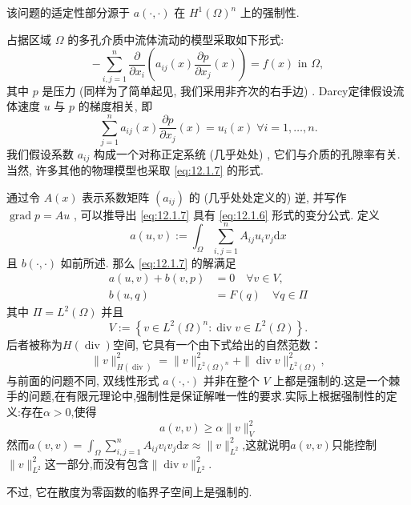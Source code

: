 该问题的适定性部分源于 $a\left( {\cdot , \cdot  }\right)$ 在 ${H}^{1}{\left( \Omega \right) }^{n}$ 上的强制性.\par
占据区域 $\Omega$ 的多孔介质中流体流动的模型采取如下形式:
\begin{equation}\label{eq:12.1.7}
- \sum\limits_{{i,j = 1}}^{n}\frac{\partial }{\partial {x}_{i}}\left( {{a}_{ij}\left( x\right) \frac{\partial p}{\partial {x}_{j}}\left( x\right) }\right)  = f\left( x\right) \text{ in }\Omega ,
\end{equation}
其中 $p$ 是压力 (同样为了简单起见, 我们采用非齐次的右手边) . Darcy定律假设流体速度 $u$ 与 $p$ 的梯度相关, 即
$$
\sum\limits_{{j = 1}}^{n}{a}_{ij}\left( x\right) \frac{\partial p}{\partial {x}_{j}}\left( x\right)  = {u}_{i}\left( x\right) \;\forall i = 1,\ldots ,n.
$$
\qquad 我们假设系数 ${a}_{ij}$ 构成一个对称正定系统 (几乎处处) , 它们与介质的孔隙率有关. 当然, 许多其他的物理模型也采取 \eqref{eq:12.1.7} 的形式.\par
通过令 $A\left( x\right)$ 表示系数矩阵 $\left( {a}_{ij}\right)$ 的 (几乎处处定义的) 逆, 并写作 $\operatorname{grad}p = Au$ , 可以推导出 \eqref{eq:12.1.7} 具有 \eqref{eq:12.1.6} 形式的变分公式. 定义
\begin{equation}\label{eq:12.1.8}
a\left( {u,v}\right) :=\int_{\Omega }\sum\limits_{{i,j = 1}}^{n}{A}_{ij}{u}_{i}{v}_{j}\mathrm{d}x
\end{equation}
且 $b\left( {\cdot , \cdot  }\right)$ 如前所述. 那么 \eqref{eq:12.1.7} 的解满足
\begin{equation}\label{eq:12.1.9}
\begin{aligned}
a\left( {u,v}\right)  + b\left( {v,p}\right)  &= 0\quad\forall v \in  V, \\
b\left( {u,q}\right)  &= F\left( q\right) \quad\forall q \in  \varPi
\end{aligned}
\end{equation}
其中 $\varPi  = {L}^{2}\left( \Omega \right)$ 并且
$$
V:=\left\{  {v \in  {L}^{2}{\left( \Omega \right) }^{n} : \operatorname{div}v \in  {L}^{2}\left( \Omega \right) }\right\}  .
$$
后者被称为$H(\operatorname{div})$空间, 它具有一个由下式给出的自然范数：
\begin{equation}\label{eq:12.1.10}
\| v\|_{H\left( \operatorname{div}\right) }^{2} = \| v\|_{{L}^{2}{\left( \Omega \right) }^{n}}^{2} + \| \operatorname{div}v\|_{{L}^{2}\left( \Omega \right) }^{2},
\end{equation}
与前面的问题不同, 双线性形式 $a\left( {\cdot , \cdot  }\right)$ 并非在整个 $V$ 上都是强制的.这是一个棘手的问题,在有限元理论中,强制性是保证解唯一性的要求.实际上根据强制性的定义:存在$\alpha>0$,使得
$$
a(v,v)\geqslant \alpha\|v\|^2_V
$$
然而$a\left( {v,v}\right) =\int_{\Omega }\sum\limits_{{i,j = 1}}^{n}{A}_{ij}{v}_{i}{v}_{j}\mathrm{d}x\approx \|v\|_{L^2}^2$,这就说明$a(v,v)$只能控制$\|v\|^2_{L^2}$这一部分,而没有包含$\| \operatorname{div}v\|_{L^2}^{2}$.\par
不过, 它在散度为零函数的临界子空间上是强制的.
